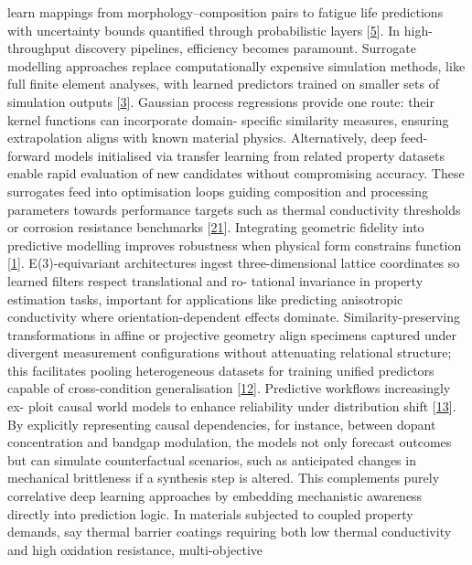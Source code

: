 \documentclass[
]{article}
\begin{document}
learn mappings from morphology--composition pairs to fatigue life
predictions with uncertainty bounds quantified through probabilistic
layers {[}\protect\hyperlink{_bookmark45}{5}{]}. In high-throughput
discovery pipelines, efficiency becomes paramount. Surrogate modelling
approaches replace computationally expensive simulation methods, like
full finite element analyses, with learned predictors trained on smaller
sets of simulation outputs {[}\protect\hyperlink{_bookmark43}{3}{]}.
Gaussian process regressions provide one route: their kernel functions
can incorporate domain- specific similarity measures, ensuring
extrapolation aligns with known material physics. Alternatively, deep
feed-forward models initialised via transfer learning from related
property datasets enable rapid evaluation of new candidates without
compromising accuracy. These surrogates feed into optimisation loops
guiding composition and processing parameters towards performance
targets such as thermal conductivity thresholds or corrosion resistance
benchmarks {[}\protect\hyperlink{_bookmark61}{21}{]}. Integrating
geometric fidelity into predictive modelling improves robustness when
physical form constrains function
{[}\protect\hyperlink{_bookmark41}{1}{]}. E(3)-equivariant architectures
ingest three-dimensional lattice coordinates so learned filters respect
translational and ro- tational invariance in property estimation tasks,
important for applications like predicting anisotropic conductivity
where orientation-dependent effects dominate. Similarity-preserving
transformations in affine or projective geometry align specimens
captured under divergent measurement configurations without attenuating
relational structure; this facilitates pooling heterogeneous datasets
for training unified predictors capable of cross-condition
generalisation {[}\protect\hyperlink{_bookmark52}{12}{]}. Predictive
workflows increasingly ex- ploit causal world models to enhance
reliability under distribution shift
{[}\protect\hyperlink{_bookmark53}{13}{]}. By explicitly representing
causal dependencies, for instance, between dopant concentration and
bandgap modulation, the models not only forecast outcomes but can
simulate counterfactual scenarios, such as anticipated changes in
mechanical brittleness if a synthesis step is altered. This complements
purely correlative deep learning approaches by embedding mechanistic
awareness directly into prediction logic. In materials subjected to
coupled property demands, say thermal barrier coatings requiring both
low thermal conductivity and high oxidation resistance, multi-objective
\end{document}
